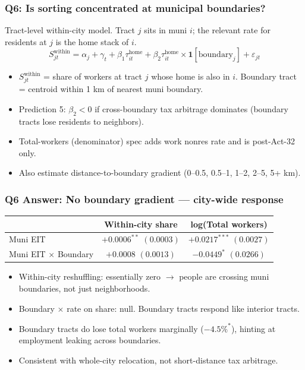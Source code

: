 \documentclass[xcolor = x11names, compress, aspectratio = 169]{beamer}
\renewcommand{\(}{\begin{columns}}
\renewcommand{\)}{\end{columns}}
\newcommand{\<}[1]{\begin{column}{#1}}
\renewcommand{\>}{\end{column}}
\begin{document}
\iffalse %
\begin{frame}
\frametitle{Q6: Is sorting concentrated at municipal boundaries?}
    \small
    Tract-level within-city model. Tract $j$ sits in muni $i$; the
    relevant rate for residents at $j$ is the home stack of $i$.
    \[
    S^{\text{within}}_{jt} = \alpha_j + \gamma_t + \beta_1 \tau^{\text{home}}_{it} + \beta_2 \tau^{\text{home}}_{it} \times \mathbf{1}[\text{boundary}_j] + \varepsilon_{jt}
    \]
    \begin{itemize}\setlength{\itemsep}{0.08cm}
        \item $S^{\text{within}}_{jt}$ = share of workers at tract $j$
        whose home is also in $i$. Boundary tract = centroid within 1 km
        of nearest muni boundary.
        \item Prediction 5: $\beta_2<0$ if cross-boundary tax arbitrage
        dominates (boundary tracts lose residents to neighbors).
        \item Total-workers (denominator) spec adds work nonres rate
        and is post-Act-32 only.
        \item Also estimate distance-to-boundary gradient
        (0--0.5, 0.5--1, 1--2, 2--5, 5+ km).
    \end{itemize}
\end{frame}

\begin{frame}
\frametitle{Q6 Answer: No boundary gradient --- city-wide response}
    \centering
    \small
    \begin{tabular}{lcc}
        \toprule
        & Within-city share & log(Total workers) \\
        \midrule
        Muni EIT             & $+0.0006^{**}$ $(0.0003)$ & $+0.0217^{***}$ $(0.0027)$ \\
        Muni EIT $\times$ Boundary & $+0.0008$ $(0.0013)$  & $-0.0449^{*}$ $(0.0266)$ \\
        \bottomrule
    \end{tabular}
    \vspace{0.2cm}
    \begin{itemize}\setlength{\itemsep}{0.05cm}
        \item Within-city reshuffling: essentially zero $\to$
        people are crossing muni boundaries, not just neighborhoods.
        \item Boundary $\times$ rate on share: null. Boundary tracts
        respond like interior tracts.
        \item Boundary tracts do lose total workers marginally ($-4.5\%^{*}$),
        hinting at employment leaking across boundaries.
        \item Consistent with whole-city relocation, not short-distance tax arbitrage.
    \end{itemize}
\end{frame}
\end{document}

